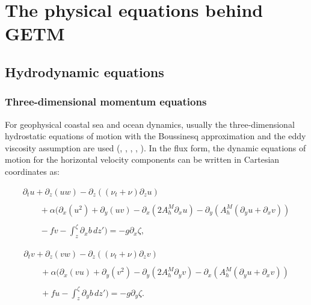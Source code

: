 \section{The physical equations behind GETM}

\subsection{Hydrodynamic equations}

\subsubsection{Three-dimensional momentum equations}\label{Section_3d_momentum}

For geophysical coastal sea 
and ocean dynamics, usually the three-dimensional hydrostatic equations
of motion with the Boussinesq approximation and the eddy 
viscosity assumption are used (\cite{BRYAN69}, \cite{COX84},
\cite{BLUMBERGea87}, \cite{HAIDVOGELea99}, \cite{KANTHAea00b}). 
In the flux form, the dynamic equations of motion for
the horizontal velocity components can be written in Cartesian
coordinates as:


\begin{equation}\label{uEq}
\begin{array}{l}
\displaystyle
\partial_t u
+\partial_z(uw)
-\partial_z\left((\nu_t+\nu) \partial_z u\right)
\\ \\ \displaystyle
\qquad+\alpha\bigg(\partial_x(u^2)+\partial_y(uv)
-\partial_x\left(2A_h^M\partial_xu\right)-\partial_y\left(A_h^M
(\partial_yu+\partial_xv)\right)
\\ \\ \displaystyle
\qquad
-fv
-\int_z^{\zeta}\partial_x b\,dz' \bigg)
=
- g\partial_x \zeta,
\end{array}
\end{equation}

\begin{equation}\label{vEq}
\begin{array}{l}
\displaystyle
\partial_t v +\partial_z(vw)
-\partial_z\left((\nu_t+\nu) \partial_z v\right)
\\ \\
\displaystyle
\qquad+\alpha\bigg(\partial_x(vu)+\partial_y(v^2)
-\partial_y\left(2A_h^M\partial_yv\right)-\partial_x\left(A_h^M
(\partial_yu+\partial_xv)\right)
\\ \\
\displaystyle
\qquad
+fu
-\int_z^{\zeta}\partial_y b\,dz' \bigg)=
- g\partial_y \zeta.
\end{array}
\end{equation}


